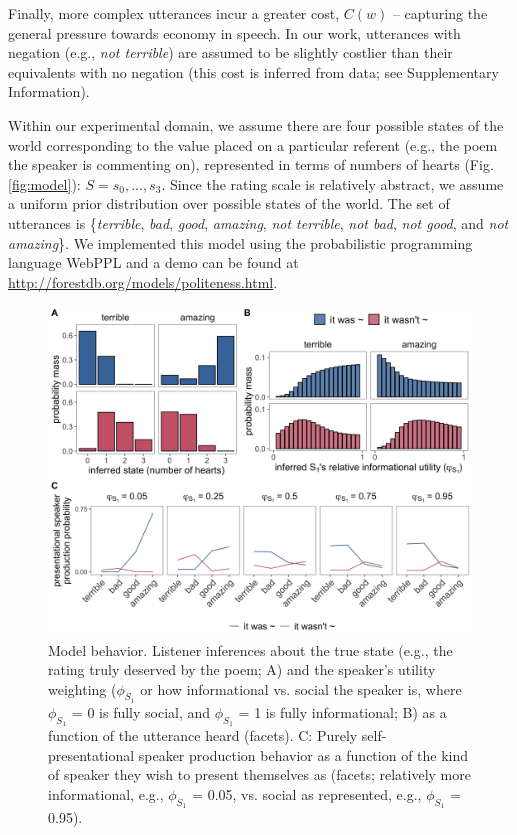\documentclass[9pt,twocolumn,twoside,lineno]{main_class_file}
\begin{document}
Finally, more complex utterances incur a greater cost, \(C(w)\) --
capturing the general pressure towards economy in speech. In our work,
utterances with negation (e.g., \emph{not terrible}) are assumed to
be slightly costlier than their equivalents with no negation (this cost is inferred
from data; see Supplementary Information).

Within our experimental domain, we assume there are four possible states
of the world corresponding to the value placed on a particular referent
(e.g., the poem the speaker is commenting on), represented in terms of numbers of hearts (Fig. \ref{fig:model}):
\(S = {s_0,...,s_3}\). Since the rating scale is relatively abstract, we assume a uniform prior distribution
over possible states of the world. The set of utterances is
\{\emph{terrible}, \emph{bad}, \emph{good}, \emph{amazing}, \emph{not
terrible}, \emph{not bad}, \emph{not good}, and \emph{not amazing}\}. We
implemented this model using the probabilistic programming language
WebPPL \cite{dippl} and a demo can be found at \url{http://forestdb.org/models/politeness.html}.

\begin{figure}[!h]
\includegraphics[width=\columnwidth]{fig/L1_inferences_wS2pres} \centering \caption{Model behavior. Listener inferences about the true state (e.g., the rating truly deserved by the poem; A) and the speaker's utility weighting ($\phi_{S_1}$ or how informational vs. social the speaker is, where $\phi_{S_1}$ = 0 is fully social, and $\phi_{S_1}$ = 1 is fully informational; B) as a function of the utterance heard (facets). C: Purely self-presentational speaker production behavior as a function of the kind of speaker they wish to present themselves as (facets; relatively more informational, e.g., $\phi_{S_1}$ = 0.05, vs. social as represented, e.g., $\phi_{S_1}$ = 0.95).}\label{fig:L1inferences}
\end{figure}
\end{document}
